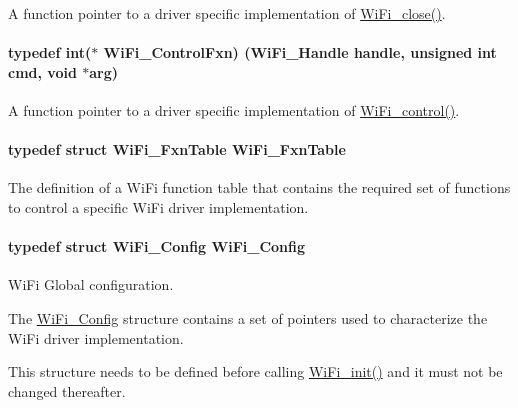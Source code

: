 A function pointer to a driver specific implementation of \hyperlink{_wi_fi_8h_a463c68dfbe1ad861adfd073942fcac46}{Wi\+Fi\+\_\+close()}. 

\paragraph[{Wi\+Fi\+\_\+\+Control\+Fxn}]{\setlength{\rightskip}{0pt plus 5cm}typedef int($\ast$ Wi\+Fi\+\_\+\+Control\+Fxn) ({\bf Wi\+Fi\+\_\+\+Handle} handle, unsigned int cmd, void $\ast$arg)}\label{_wi_fi_8h_a2b33be721c0a64e9d4059f5318cf32f6}


A function pointer to a driver specific implementation of \hyperlink{_wi_fi_8h_a1f42a1e174ed1682b7de43ec6f043bf7}{Wi\+Fi\+\_\+control()}. 

\paragraph[{Wi\+Fi\+\_\+\+Fxn\+Table}]{\setlength{\rightskip}{0pt plus 5cm}typedef struct {\bf Wi\+Fi\+\_\+\+Fxn\+Table}  {\bf Wi\+Fi\+\_\+\+Fxn\+Table}}\label{_wi_fi_8h_ac9f5dd5ed47beee3ae78f5c3dc110cdb}


The definition of a Wi\+Fi function table that contains the required set of functions to control a specific Wi\+Fi driver implementation. 

\paragraph[{Wi\+Fi\+\_\+\+Config}]{\setlength{\rightskip}{0pt plus 5cm}typedef struct {\bf Wi\+Fi\+\_\+\+Config}  {\bf Wi\+Fi\+\_\+\+Config}}\label{_wi_fi_8h_ac319cd4fddeb63624579ecd4d4275631}


Wi\+Fi Global configuration. 

The \hyperlink{struct_wi_fi___config}{Wi\+Fi\+\_\+\+Config} structure contains a set of pointers used to characterize the Wi\+Fi driver implementation.

This structure needs to be defined before calling \hyperlink{_wi_fi_8h_a306a67ecbf66c31b31ee62a7170c563c}{Wi\+Fi\+\_\+init()} and it must not be changed thereafter.

